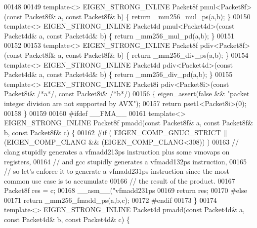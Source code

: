 \begin{DoxyCode}
00148 
00149 \textcolor{keyword}{template}<> EIGEN\_STRONG\_INLINE Packet8f pmul<Packet8f>(\textcolor{keyword}{const} Packet8f& a, \textcolor{keyword}{const} Packet8f& b) \{ \textcolor{keywordflow}{return} 
      \_mm256\_mul\_ps(a,b); \}
00150 \textcolor{keyword}{template}<> EIGEN\_STRONG\_INLINE Packet4d pmul<Packet4d>(\textcolor{keyword}{const} Packet4d& a, \textcolor{keyword}{const} Packet4d& b) \{ \textcolor{keywordflow}{return} 
      \_mm256\_mul\_pd(a,b); \}
00151 
00152 
00153 \textcolor{keyword}{template}<> EIGEN\_STRONG\_INLINE Packet8f pdiv<Packet8f>(\textcolor{keyword}{const} Packet8f& a, \textcolor{keyword}{const} Packet8f& b) \{ \textcolor{keywordflow}{return} 
      \_mm256\_div\_ps(a,b); \}
00154 \textcolor{keyword}{template}<> EIGEN\_STRONG\_INLINE Packet4d pdiv<Packet4d>(\textcolor{keyword}{const} Packet4d& a, \textcolor{keyword}{const} Packet4d& b) \{ \textcolor{keywordflow}{return} 
      \_mm256\_div\_pd(a,b); \}
00155 \textcolor{keyword}{template}<> EIGEN\_STRONG\_INLINE Packet8i pdiv<Packet8i>(\textcolor{keyword}{const} Packet8i& \textcolor{comment}{/*a*/}, \textcolor{keyword}{const} Packet8i& \textcolor{comment}{/*b*/})
00156 \{ eigen\_assert(\textcolor{keyword}{false} && \textcolor{stringliteral}{"packet integer division are not supported by AVX"});
00157   \textcolor{keywordflow}{return} pset1<Packet8i>(0);
00158 \}
00159 
00160 \textcolor{preprocessor}{#ifdef \_\_FMA\_\_}
00161 \textcolor{keyword}{template}<> EIGEN\_STRONG\_INLINE Packet8f pmadd(\textcolor{keyword}{const} Packet8f& a, \textcolor{keyword}{const} Packet8f& b, \textcolor{keyword}{const} Packet8f& c) \{
00162 \textcolor{preprocessor}{#if ( EIGEN\_COMP\_GNUC\_STRICT || (EIGEN\_COMP\_CLANG && (EIGEN\_COMP\_CLANG<308)) )}
00163   \textcolor{comment}{// clang stupidly generates a vfmadd213ps instruction plus some vmovaps on registers,}
00164   \textcolor{comment}{// and gcc stupidly generates a vfmadd132ps instruction,}
00165   \textcolor{comment}{// so let's enforce it to generate a vfmadd231ps instruction since the most common use case is to
       accumulate}
00166   \textcolor{comment}{// the result of the product.}
00167   Packet8f res = c;
00168   \_\_asm\_\_(\textcolor{stringliteral}{"vfmadd231ps %
00169   \textcolor{keywordflow}{return} res;
00170 \textcolor{preprocessor}{#else}
00171   \textcolor{keywordflow}{return} \_mm256\_fmadd\_ps(a,b,c);
00172 \textcolor{preprocessor}{#endif}
00173 \}
00174 \textcolor{keyword}{template}<> EIGEN\_STRONG\_INLINE Packet4d pmadd(\textcolor{keyword}{const} Packet4d& a, \textcolor{keyword}{const} Packet4d& b, \textcolor{keyword}{const} Packet4d& c) \{
}
\end{DoxyCode}
